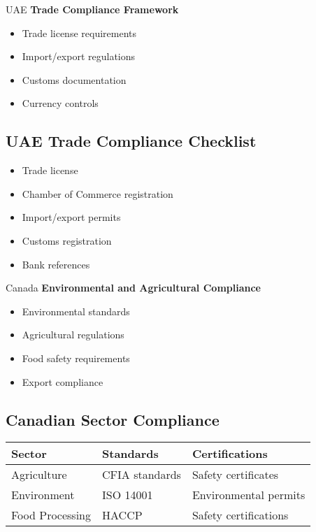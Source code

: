 \begin{regionalbox}{UAE}
\textbf{Trade Compliance Framework}
\begin{itemize}
    \item Trade license requirements
    \item Import/export regulations
    \item Customs documentation
    \item Currency controls
\end{itemize}

\subsection{UAE Trade Compliance Checklist}
\begin{tcolorbox}[colback=white,colframe=primary,title=\textbf{Required Documents}]
\begin{itemize}
    \item Trade license
    \item Chamber of Commerce registration
    \item Import/export permits
    \item Customs registration
    \item Bank references
\end{itemize}
\end{tcolorbox}
\end{regionalbox}

\begin{regionalbox}{Canada}
\textbf{Environmental and Agricultural Compliance}
\begin{itemize}
    \item Environmental standards
    \item Agricultural regulations
    \item Food safety requirements
    \item Export compliance
\end{itemize}

\subsection{Canadian Sector Compliance}
\begin{center}
\begin{tabularx}{\textwidth}{>{\raggedright\arraybackslash}X >{\centering\arraybackslash}X >{\raggedright\arraybackslash}X}
    \toprule
    \textbf{Sector} & \textbf{Standards} & \textbf{Certifications} \\
    \midrule
    Agriculture & CFIA standards & Safety certificates \\
    Environment & ISO 14001 & Environmental permits \\
    Food Processing & HACCP & Safety certifications \\
    \bottomrule
\end{tabularx}
\end{center}
\end{regionalbox}

